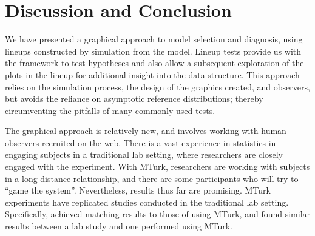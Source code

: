 \documentclass[12pt]{article} %
\newcommand{\hhnote}[1]{\todo[inline,color=orange!40]{#1}}
\begin{document}
\section{Discussion and Conclusion}\label{sec:conclusion}

We have presented a graphical approach to model selection and diagnosis, using lineups constructed by simulation from the model. %
Lineup tests provide us with the framework to test hypotheses and also allow a  subsequent exploration of the plots in the lineup  for additional insight into the data structure. This approach relies  on the simulation process, the design of the graphics created, and observers, but avoids the reliance on asymptotic reference distributions; thereby circumventing the pitfalls of many commonly used tests. 


The graphical approach is relatively new, and involves working with human observers recruited on the web. There is a vast experience in statistics in engaging subjects in a traditional lab setting, where researchers are closely engaged with the experiment. With MTurk, researchers are working with subjects in a long distance relationship, and there are some participants who will try to ``game the system''. Nevertheless, results thus far are promising. MTurk experiments have replicated studies conducted in the traditional lab setting. Specifically, \citet{heer:2010} achieved matching results to those of \citet{cleveland:1984} using MTurk, and \citet{kosara:2010} found similar results between a lab study and one performed using MTurk.
\end{document}
